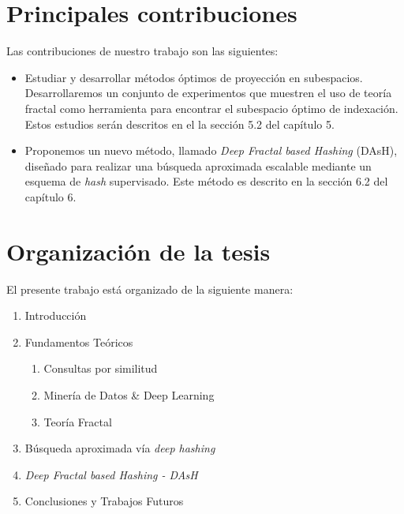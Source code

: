 \section{Principales contribuciones}

 

Las contribuciones de nuestro trabajo son las siguientes:
\begin{itemize}

    \item  Estudiar y desarrollar  métodos óptimos de proyección en subespacios. Desarrollaremos un conjunto de experimentos que muestren el uso de teoría fractal como herramienta para encontrar  el subespacio óptimo  de indexación.    Estos estudios serán   descritos en el la sección 5.2 del capítulo 5.

  \item Proponemos un nuevo método, llamado \textit{Deep Fractal based  Hashing} (DAsH), diseñado para realizar una búsqueda aproximada escalable mediante un esquema de \textit{hash} supervisado. Este m\'etodo es descrito en la sección 6.2 del capítulo 6.
\end{itemize}

\section{Organización de la tesis}

El presente trabajo está organizado de la siguiente manera: 

\bigskip
\begin{enumerate}
	\item Introducción
	\item Fundamentos Teóricos
	\begin{enumerate}
		\item Consultas por similitud
		\item Minería de Datos \& Deep Learning
		\item Teoría Fractal
	\end{enumerate}
	\item Búsqueda aproximada vía \textit{deep hashing} 
	\item \textit{Deep Fractal based Hashing - DAsH}
	\item Conclusiones y Trabajos Futuros
\end{enumerate}



